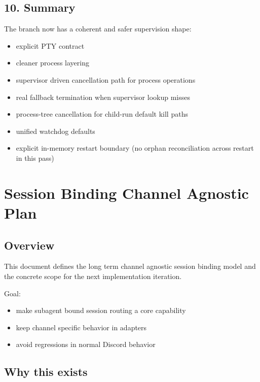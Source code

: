 \subsection{10. Summary}


The branch now has a coherent and safer supervision shape:

\begin{itemize}
  \item explicit PTY contract
  \item cleaner process layering
  \item supervisor driven cancellation path for process operations
  \item real fallback termination when supervisor lookup misses
  \item process-tree cancellation for child-run default kill paths
  \item unified watchdog defaults
  \item explicit in-memory restart boundary (no orphan reconciliation across restart in this pass)
\end{itemize}



\clearpage

\section{Session Binding Channel Agnostic Plan}


\subsection{Overview}


This document defines the long term channel agnostic session binding model and the concrete scope for the next implementation iteration.

Goal:

\begin{itemize}
  \item make subagent bound session routing a core capability
  \item keep channel specific behavior in adapters
  \item avoid regressions in normal Discord behavior
\end{itemize}


\subsection{Why this exists}


